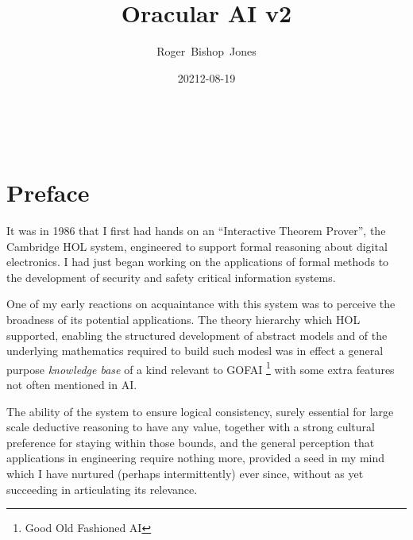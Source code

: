 \documentclass[10pt,titlepage]{article}
\title{\bf\LARGE Oracular AI v2}
\author{Roger~Bishop~Jones}
\date{\small 20212-08-19}
\newcommand{\ignore}[1]{}
\begin{document}

%
                               
\begin{titlepage}
\maketitle





\end{titlepage}

\ \

\ignore{
\begin{centering}
{}
\end{centering}
}%

\setcounter{tocdepth}{2}
{\parskip-0pt\tableofcontents}



\section*{Preface}

It was in 1986 that I first had hands on an ``Interactive Theorem Prover'', the Cambridge HOL system,
engineered to support formal reasoning about digital electronics.
I had just began working on the applications of formal methods to the development of security and safety critical information systems.

One of my early reactions on acquaintance with this system was to perceive the broadness of its potential applications.
The theory hierarchy which HOL supported, enabling the structured development of abstract models and of  the underlying mathematics required to build such modesl was in effect a general purpose \emph{knowledge base} of a kind relevant to GOFAI \footnote{Good Old Fashioned AI} with some extra features not often mentioned in AI.

The ability of the system to ensure logical consistency, surely essential for large scale deductive reasoning to have any value, together with a strong cultural preference for staying within those bounds, and the general perception that applications in engineering require nothing more, provided a seed in my mind which I have nurtured (perhaps intermittently) ever since, without as yet succeeding in articulating its relevance.
\end{document}

